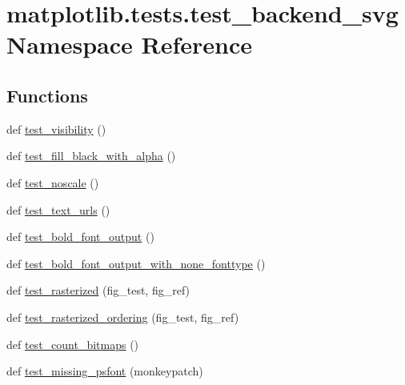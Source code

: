 \hypertarget{namespacematplotlib_1_1tests_1_1test__backend__svg}{}\section{matplotlib.\+tests.\+test\+\_\+backend\+\_\+svg Namespace Reference}
\label{namespacematplotlib_1_1tests_1_1test__backend__svg}
\subsection*{Functions}
\begin{DoxyCompactItemize}
\item 
def \hyperlink{namespacematplotlib_1_1tests_1_1test__backend__svg_ad9faae9c23e4c355f31e905e4cd9988c}{test\+\_\+visibility} ()
\item 
def \hyperlink{namespacematplotlib_1_1tests_1_1test__backend__svg_a6e3f9a483da1afb0376eeec8e56f4434}{test\+\_\+fill\+\_\+black\+\_\+with\+\_\+alpha} ()
\item 
def \hyperlink{namespacematplotlib_1_1tests_1_1test__backend__svg_acfa908fc96b60d2db87f5ef717b18586}{test\+\_\+noscale} ()
\item 
def \hyperlink{namespacematplotlib_1_1tests_1_1test__backend__svg_ac3823a9c836a430c325cb5ed2c7154bd}{test\+\_\+text\+\_\+urls} ()
\item 
def \hyperlink{namespacematplotlib_1_1tests_1_1test__backend__svg_a316914e5788bd14b55d32326f5385f61}{test\+\_\+bold\+\_\+font\+\_\+output} ()
\item 
def \hyperlink{namespacematplotlib_1_1tests_1_1test__backend__svg_a3cf64eae526db6df38f8f9942d7a257b}{test\+\_\+bold\+\_\+font\+\_\+output\+\_\+with\+\_\+none\+\_\+fonttype} ()
\item 
def \hyperlink{namespacematplotlib_1_1tests_1_1test__backend__svg_a7bc9d684409bc1f72a83638d1d878f0f}{test\+\_\+rasterized} (fig\+\_\+test, fig\+\_\+ref)
\item 
def \hyperlink{namespacematplotlib_1_1tests_1_1test__backend__svg_aa2c600ff4b95461374b6854c98448eee}{test\+\_\+rasterized\+\_\+ordering} (fig\+\_\+test, fig\+\_\+ref)
\item 
def \hyperlink{namespacematplotlib_1_1tests_1_1test__backend__svg_a9e3ab1cf481d0c09163d4626901ea3ea}{test\+\_\+count\+\_\+bitmaps} ()
\item 
def \hyperlink{namespacematplotlib_1_1tests_1_1test__backend__svg_a3b157613592125389c7a1306a735d46a}{test\+\_\+missing\+\_\+psfont} (monkeypatch)

\end{DoxyCompactItemize}
